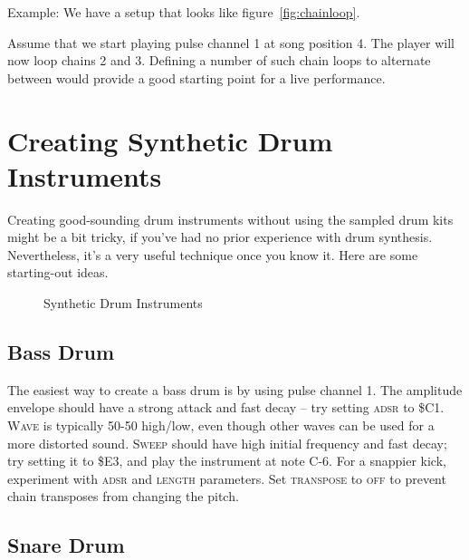 Example: We have a setup that looks like figure~\ref{fig:chainloop}.

Assume that we start playing pulse channel 1 at song position 4. The player will now loop chains 2 and 3. Defining a number of such chain loops to alternate between would provide a good starting point for a live performance.

\section{Creating Synthetic Drum Instruments}

Creating good-sounding drum instruments without using the sampled drum kits might be a bit tricky, if you've had no prior experience with drum synthesis. Nevertheless, it's a very useful technique once you know it. Here are some starting-out ideas.

\begin{figure}[hbtp]
	\centering
	\qquad

	\qquad

	\qquad

	\caption{Synthetic Drum Instruments}
	\label{fig:instr-examples}
\end{figure}

\subsection{Bass Drum}

The easiest way to create a bass drum is by using pulse channel 1. The amplitude envelope should have a strong attack and fast decay -- try setting \textsc{adsr} to \$C1. \textsc{Wave} is typically 50-50 high/low, even though other waves can be used for a more distorted sound. \textsc{Sweep} should have high initial frequency and fast decay; try setting it to \$E3, and play the instrument at note C-6. For a snappier kick, experiment with \textsc{adsr} and \textsc{length} parameters. Set \textsc{transpose} to \textsc{off} to prevent chain transposes from changing the pitch.

\subsection{Snare Drum}

